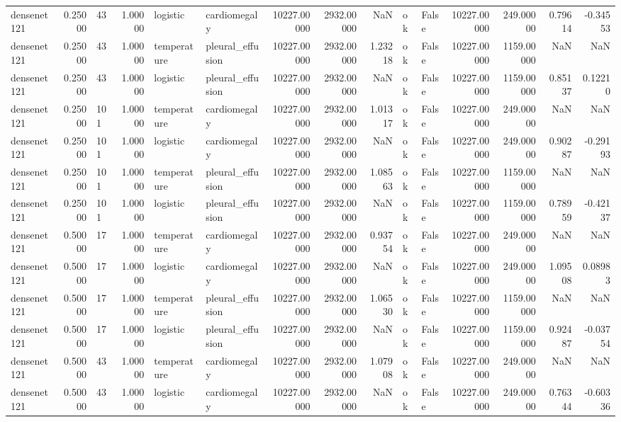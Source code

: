 \begin{tabular}{lrlrllrrrllrrrr}
densenet121 & 0.25000 & 43 & 1.00000 & logistic & cardiomegaly & 10227.00000 & 2932.00000 & NaN & ok & False & 10227.00000 & 249.00000 & 0.79614 & -0.34553 \\
densenet121 & 0.25000 & 43 & 1.00000 & temperature & pleural\_effusion & 10227.00000 & 2932.00000 & 1.23218 & ok & False & 10227.00000 & 1159.00000 & NaN & NaN \\
densenet121 & 0.25000 & 43 & 1.00000 & logistic & pleural\_effusion & 10227.00000 & 2932.00000 & NaN & ok & False & 10227.00000 & 1159.00000 & 0.85137 & 0.12210 \\
densenet121 & 0.25000 & 101 & 1.00000 & temperature & cardiomegaly & 10227.00000 & 2932.00000 & 1.01317 & ok & False & 10227.00000 & 249.00000 & NaN & NaN \\
densenet121 & 0.25000 & 101 & 1.00000 & logistic & cardiomegaly & 10227.00000 & 2932.00000 & NaN & ok & False & 10227.00000 & 249.00000 & 0.90287 & -0.29193 \\
densenet121 & 0.25000 & 101 & 1.00000 & temperature & pleural\_effusion & 10227.00000 & 2932.00000 & 1.08563 & ok & False & 10227.00000 & 1159.00000 & NaN & NaN \\
densenet121 & 0.25000 & 101 & 1.00000 & logistic & pleural\_effusion & 10227.00000 & 2932.00000 & NaN & ok & False & 10227.00000 & 1159.00000 & 0.78959 & -0.42137 \\
densenet121 & 0.50000 & 17 & 1.00000 & temperature & cardiomegaly & 10227.00000 & 2932.00000 & 0.93754 & ok & False & 10227.00000 & 249.00000 & NaN & NaN \\
densenet121 & 0.50000 & 17 & 1.00000 & logistic & cardiomegaly & 10227.00000 & 2932.00000 & NaN & ok & False & 10227.00000 & 249.00000 & 1.09508 & 0.08983 \\
densenet121 & 0.50000 & 17 & 1.00000 & temperature & pleural\_effusion & 10227.00000 & 2932.00000 & 1.06530 & ok & False & 10227.00000 & 1159.00000 & NaN & NaN \\
densenet121 & 0.50000 & 17 & 1.00000 & logistic & pleural\_effusion & 10227.00000 & 2932.00000 & NaN & ok & False & 10227.00000 & 1159.00000 & 0.92487 & -0.03754 \\
densenet121 & 0.50000 & 43 & 1.00000 & temperature & cardiomegaly & 10227.00000 & 2932.00000 & 1.07908 & ok & False & 10227.00000 & 249.00000 & NaN & NaN \\
densenet121 & 0.50000 & 43 & 1.00000 & logistic & cardiomegaly & 10227.00000 & 2932.00000 & NaN & ok & False & 10227.00000 & 249.00000 & 0.76344 & -0.60336 \\

\end{tabular}
